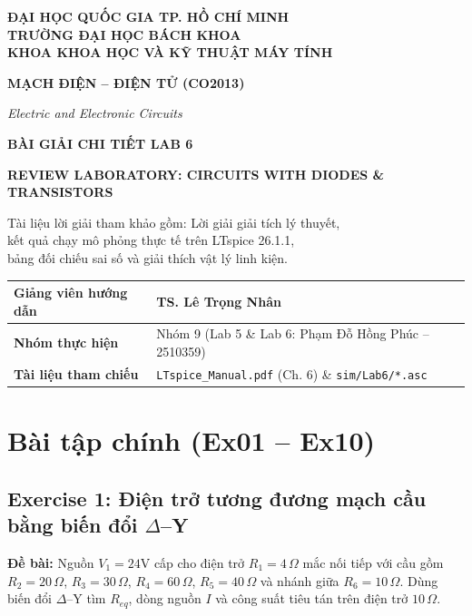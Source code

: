 \documentclass[11pt,a4paper]{article}
\newcommand{\cmd}[1]{\texttt{#1}}
\begin{document}
\begin{titlepage}
\centering
\vspace*{1.5cm}
{\sffamily\bfseries\large ĐẠI HỌC QUỐC GIA TP. HỒ CHÍ MINH\\
TRƯỜNG ĐẠI HỌC BÁCH KHOA\\
KHOA KHOA HỌC VÀ KỸ THUẬT MÁY TÍNH\par}
\vspace{1.8cm}
{\sffamily\bfseries\Large\color{navy} MẠCH ĐIỆN -- ĐIỆN TỬ (CO2013)\par}
{\itshape\color{navy} Electric and Electronic Circuits\par}
\vspace{1.6cm}
{\sffamily\bfseries\Huge\color{navy} BÀI GIẢI CHI TIẾT LAB 6\par}
\vspace{0.4cm}
{\sffamily\bfseries\Large\color{accent} REVIEW LABORATORY: CIRCUITS WITH DIODES \& TRANSISTORS\par}
\vspace{1.2cm}
{\normalsize Tài liệu lời giải tham khảo gồm: Lời giải giải tích lý thuyết,\\
kết quả chạy mô phỏng thực tế trên LTspice 26.1.1,\\
bảng đối chiếu sai số và giải thích vật lý linh kiện.\par}
\vfill
\renewcommand{\arraystretch}{1.4}
\begin{tabular}{|>{\bfseries\sffamily}p{4.5cm}|p{8.5cm}|}
\hline
Giảng viên hướng dẫn & TS. Lê Trọng Nhân \\ \hline
Nhóm thực hiện & Nhóm 9 (Lab 5 \& Lab 6: Phạm Đỗ Hồng Phúc -- 2510359) \\ \hline
Tài liệu tham chiếu & \cmd{LTspice\_Manual.pdf} (Ch. 6) \& \cmd{sim/Lab6/*.asc} \\ \hline
\end{tabular}
\vspace{1cm}
\end{titlepage}

\tableofcontents
\newpage

\section{Bài tập chính (Ex01 -- Ex10)}

\subsection{Exercise 1: Điện trở tương đương mạch cầu bằng biến đổi \texorpdfstring{$\Delta$--Y}{Delta-Y}}
\textbf{Đề bài:} Nguồn $V_1=24\text{V}$ cấp cho điện trở $R_1=4\,\Omega$ mắc nối tiếp với cầu gồm $R_2=20\,\Omega$, $R_3=30\,\Omega$, $R_4=60\,\Omega$, $R_5=40\,\Omega$ và nhánh giữa $R_6=10\,\Omega$. Dùng biến đổi $\Delta$--Y tìm $R_{eq}$, dòng nguồn $I$ và công suất tiêu tán trên điện trở $10\,\Omega$.
\end{document}

